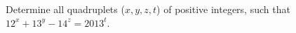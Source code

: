 Determine all quadruplets ($x, y, z, t$) of positive integers, such that $12^x + 13^y - 14^z = 2013^t$.